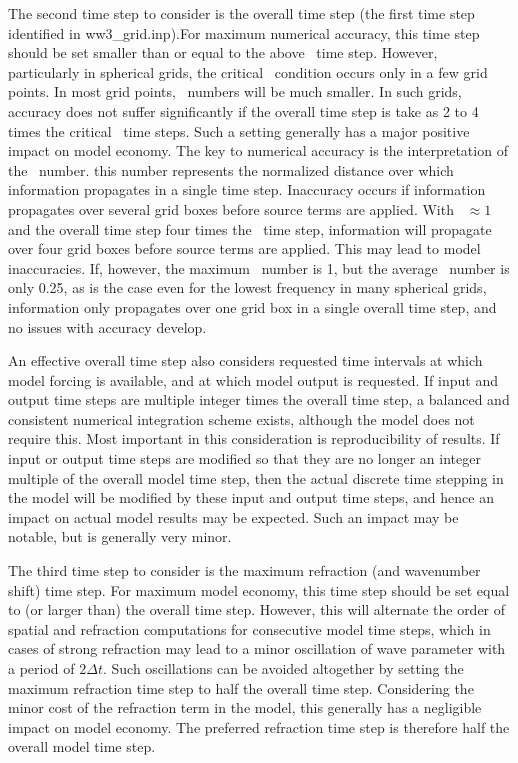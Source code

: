 The second time step to consider is the overall time step (the first time step
identified in {\file ww3\_grid.inp}).For maximum numerical accuracy, this time
step should be set smaller than or equal to the above \cfl\ time step.
However, particularly in spherical grids, the critical \cfl\ condition occurs
only in a few grid points. In most grid points, \cfl\ numbers will be much
smaller. In such grids, accuracy does not suffer significantly if the overall
time step is take as 2 to 4 times the critical \cfl\ time steps. Such a
setting generally has a major positive impact on model economy. The key to
numerical accuracy is the interpretation of the \cfl\ number. this number
represents the normalized distance over which information propagates in a
single time step. Inaccuracy occurs if information propagates over several
grid boxes before source terms are applied. With \cfl\ $\approx 1$ and the
overall time step four times the \cfl\ time step, information will propagate
over four grid boxes before source terms are applied. This may lead to model
inaccuracies. If, however, the maximum \cfl\ number is 1, but the average
\cfl\ number is only 0.25, as is the case even for the lowest frequency in
many spherical grids, information only propagates over one grid box in a
single overall time step, and no issues with accuracy develop.

An effective overall time step also considers requested time intervals at
which model forcing is available, and at which model output is requested. If
input and output time steps are multiple integer times the overall time step,
a balanced and consistent numerical integration scheme exists, although the
model does not require this. Most important in this consideration is
reproducibility of results. If input or output time steps are modified so that
they are no longer an integer multiple of the overall model time step, then
the actual discrete time stepping in the model will be modified by these input
and output time steps, and hence an impact on actual model results may be
expected. Such an impact may be notable, but is generally very minor.

The third time step to consider is the maximum refraction (and wavenumber
shift) time step. For maximum model economy, this time step should be set
equal to (or larger than) the overall time step. However, this will alternate
the order of spatial and refraction computations for consecutive model time
steps, which in cases of strong refraction may lead to a minor oscillation of
wave parameter with a period of $2 \Delta t$. Such oscillations can be avoided
altogether by setting the maximum refraction time step to half the overall
time step. Considering the minor cost of the refraction term in the model,
this generally has a negligible impact on model economy. The preferred
refraction time step is therefore half the overall model time step.

